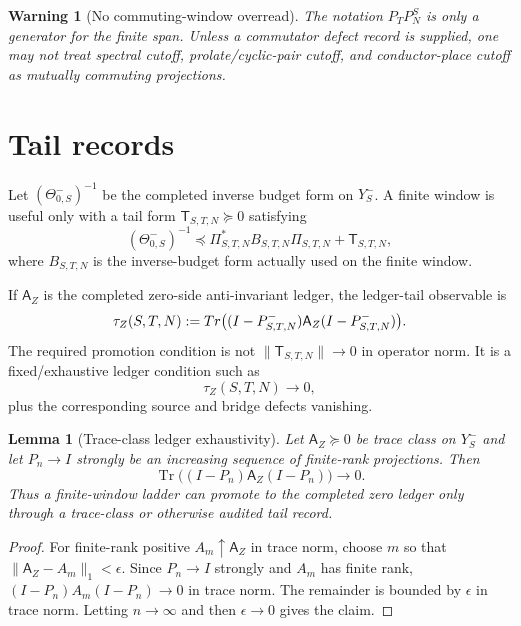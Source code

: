 \documentclass[11pt]{article}
\newtheorem{lemma}{Lemma}
\newtheorem{warning}{Warning}
\newcommand{\Y}{Y}
\newcommand{\Ttail}{\mathsf T}
\newcommand{\Tr}{\operatorname{Tr}}
\begin{document}
\begin{warning}[No commuting-window overread]
The notation $P_TP_N^S$ is only a generator for the finite span.  Unless a commutator defect record is supplied, one may not treat spectral cutoff, prolate/cyclic-pair cutoff, and conductor-place cutoff as mutually commuting projections.
\end{warning}

\section{Tail records}
Let $(\Theta_{0,S}^-)^{-1}$ be the completed inverse budget form on $\Y_S^-$.  A finite window is useful only with a tail form $\Ttail_{S,T,N}\succeq0$ satisfying
\begin{equation}\label{eq:tail-form}
  (\Theta_{0,S}^-)^{-1}
  \preceq
  \Pi_{S,T,N}^{*}B_{S,T,N}\Pi_{S,T,N}
  +\Ttail_{S,T,N},
\end{equation}
where $B_{S,T,N}$ is the inverse-budget form actually used on the finite window.

If $\mathsf A_Z$ is the completed zero-side anti-invariant ledger, the ledger-tail observable is
\[
  \tau_Z(S,T,N):=\\Tr\bigl((I-P_{S,T,N}^-)\mathsf A_Z(I-P_{S,T,N}^-)\bigr).
\]
The required promotion condition is not $\|\Ttail_{S,T,N}\|\to0$ in operator norm.  It is a fixed/exhaustive ledger condition such as
\[
  \tau_Z(S,T,N)\to0,
\]
plus the corresponding source and bridge defects vanishing.

\begin{lemma}[Trace-class ledger exhaustivity]
Let $\mathsf A_Z\succeq0$ be trace class on $\Y_S^-$ and let $P_n\to I$ strongly be an increasing sequence of finite-rank projections. Then
\[
  \Tr\bigl((I-P_n)\mathsf A_Z(I-P_n)\bigr)\to0.
\]
Thus a finite-window ladder can promote to the completed zero ledger only through a trace-class or otherwise audited tail record.
\end{lemma}

\begin{proof}
For finite-rank positive $A_m\uparrow \mathsf A_Z$ in trace norm, choose $m$ so that $\|\mathsf A_Z-A_m\|_1<\epsilon$.  Since $P_n\to I$ strongly and $A_m$ has finite rank, $(I-P_n)A_m(I-P_n)\to0$ in trace norm.  The remainder is bounded by $\epsilon$ in trace norm.  Letting $n\to\infty$ and then $\epsilon\to0$ gives the claim.
\end{proof}
\end{document}
